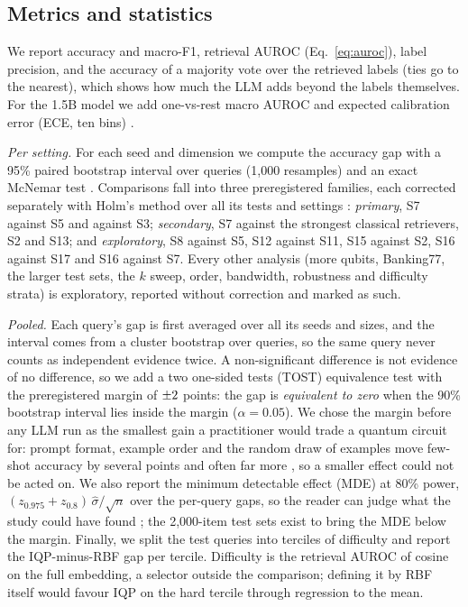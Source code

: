 \subsection{Metrics and statistics}
We report accuracy and macro-F1, retrieval AUROC (Eq.~\ref{eq:auroc}), label precision, and the
accuracy of a majority vote over the retrieved labels (ties go to the nearest), which shows how much the
LLM adds beyond the labels themselves. For the 1.5B model we add one-vs-rest macro AUROC
\cite{fawcett2006roc} and expected calibration error (ECE, ten bins) \cite{guo2017calibration}.

\emph{Per setting.} For each seed and dimension we compute the accuracy gap with a 95\% paired bootstrap
interval over queries (1{,}000 resamples) and an exact McNemar test \cite{mcnemar1947note}. Comparisons
fall into three preregistered families, each corrected separately with Holm's method \cite{holm1979simple}
over all its tests and settings \cite{dror2018hitchhiker}: \emph{primary}, S7 against S5 and against S3;
\emph{secondary}, S7 against the strongest classical retrievers, S2 and S13; and \emph{exploratory}, S8
against S5, S12 against S11, S15 against S2, S16 against S17 and S16 against S7. Every other analysis
(more qubits, Banking77, the larger test sets, the $k$ sweep, order, bandwidth, robustness and difficulty
strata) is exploratory, reported without correction and marked as such.

\emph{Pooled.} Each query's gap is first averaged over all its seeds and sizes, and the interval comes from a
cluster bootstrap over queries, so the same query never counts as independent evidence twice. A
non-significant difference is not evidence of no difference, so we add a two one-sided tests (TOST)
equivalence test \cite{schuirmann1987tost,lakens2017equivalence} with the preregistered margin of
$\pm2$ points: the gap is \emph{equivalent to zero} when the 90\% bootstrap interval lies inside
the margin ($\alpha=0.05$). We chose the margin before any LLM run as the smallest gain a practitioner
would trade a quantum circuit for: prompt format, example order and the random draw of examples move
few-shot accuracy by several points and often far more \cite{lu2022fantastically,zhao2021calibrate}, so a
smaller effect could not be acted on. \TMarginCheck{} We also report the minimum detectable effect (MDE) at 80\%
power, $(z_{0.975}+z_{0.8})\,\hat\sigma/\sqrt{n}$ over the per-query gaps, so the reader can judge what the
study could have found \cite{card2020power}; the 2{,}000-item test sets exist to bring the MDE below the
margin. Finally, we split the test queries into terciles of difficulty and report the IQP-minus-RBF gap
per tercile. Difficulty is the retrieval AUROC of cosine on the full embedding, a selector outside the
comparison; defining it by RBF itself would favour IQP on the hard tercile through regression to the mean.

